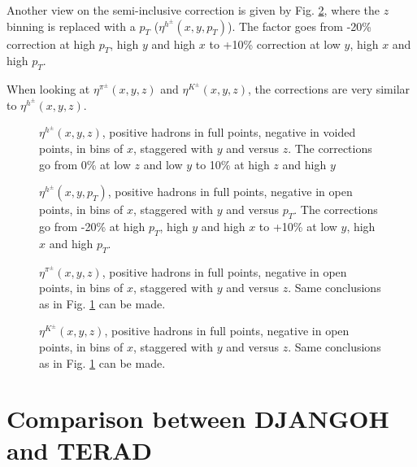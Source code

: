 Another view on the semi-inclusive correction is given by Fig. \ref{fig:hadpt_ratio}, where the $z$ binning is replaced with a
$p_T$ ($\eta^{h^{\pm}}(x,y,p_T)$). The factor goes from -20\% correction at high $p_T$, high $y$ and high $x$
to +10\% correction at low $y$, high $x$ and high $p_T$.

When looking at $\eta^{\pi^{\pm}}(x,y,z)$ and $\eta^{K^{\pm}}(x,y,z)$, the corrections are very similar to $\eta^{h^{\pm}}(x,y,z)$.

\newpage
\begin{figure}[!htb]
\centerline{}
\caption{$\eta^{h^{\pm}}(x,y,z)$, positive hadrons in full points, negative in voided points, in bins of $x$, staggered with $y$ and versus $z$.
The corrections go from 0\% at low $z$ and low $y$ to 10\% at high $z$ and high $y$}\label{fig:hadz_ratio}
\end{figure}

\begin{figure}[!htb]
\centerline{}
\caption{$\eta^{h^{\pm}}(x,y,p_T)$, positive hadrons in full points, negative in open points, in bins of $x$, staggered with $y$ and versus $p_T$.
The corrections go from -20\% at high $p_T$, high $y$ and high $x$ to +10\% at low $y$, high $x$ and high $p_T$.}\label{fig:hadpt_ratio}
\end{figure}

\newpage

\begin{figure}[!htb]
\centerline{}
\caption{$\eta^{\pi^{\pm}}(x,y,z)$, positive hadrons in full points, negative in open points, in bins of $x$, staggered with $y$ and versus $z$.
Same conclusions as in Fig. \ref{fig:hadz_ratio} can be made.}\label{fig:piz_ratio}
\end{figure}

\begin{figure}[!htb]
\centerline{}
\caption{$\eta^{K^{\pm}}(x,y,z)$, positive hadrons in full points, negative in open points, in bins of $x$, staggered with $y$ and versus $z$.
Same conclusions as in Fig. \ref{fig:hadz_ratio} can be made.}\label{fig:kz_ratio}
\end{figure}


\section{Comparison between DJANGOH and TERAD}

